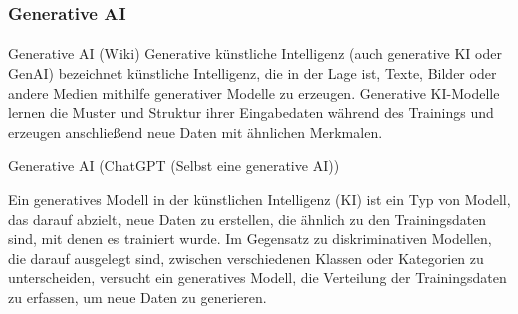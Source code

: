 \documentclass{beamer}
\begin{document}
\begin{frame}
    \frametitle{Generative AI}
\framesubtitle{}
\begin{block}{Generative AI (Wiki)}
    Generative künstliche Intelligenz (auch generative KI oder GenAI) bezeichnet künstliche Intelligenz, 
    die in der Lage ist, Texte, Bilder oder andere Medien mithilfe generativer Modelle zu erzeugen. Generative KI-Modelle lernen die Muster und Struktur ihrer Eingabedaten während des Trainings und erzeugen anschließend neue Daten mit ähnlichen Merkmalen.
\end{block}
\begin{block}{Generative AI (ChatGPT (Selbst eine generative AI))}
 
Ein generatives Modell in der künstlichen Intelligenz (KI) ist ein Typ von Modell, 
das darauf abzielt, neue Daten zu erstellen, die ähnlich zu den Trainingsdaten sind, 
mit denen es trainiert wurde. Im Gegensatz zu diskriminativen Modellen, 
die darauf ausgelegt sind, zwischen verschiedenen Klassen oder Kategorien zu unterscheiden, 
versucht ein generatives Modell, 
die Verteilung der Trainingsdaten zu erfassen, um neue Daten zu generieren.
\end{block}
\end{frame}
\end{document}
